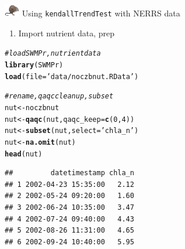 \documentclass[xcolor=dvipsnames,serif]{beamer}\usepackage[]{graphicx}\usepackage[]{color}
\makeatletter
\newcommand{\hlnum}[1]{\textcolor[rgb]{0.686,0.059,0.569}{#1}}%
\newcommand{\hlstr}[1]{\textcolor[rgb]{0.192,0.494,0.8}{#1}}%
\newcommand{\hlcom}[1]{\textcolor[rgb]{0.678,0.584,0.686}{\textit{#1}}}%
\newcommand{\hlstd}[1]{\textcolor[rgb]{0.345,0.345,0.345}{#1}}%
\newcommand{\hlkwb}[1]{\textcolor[rgb]{0.69,0.353,0.396}{#1}}%
\newcommand{\hlkwc}[1]{\textcolor[rgb]{0.333,0.667,0.333}{#1}}%
\newcommand{\hlkwd}[1]{\textcolor[rgb]{0.737,0.353,0.396}{\textbf{#1}}}%
\newenvironment{kframe}{%
 \def\at@end@of@kframe{}%
 \ifinner\ifhmode%
  \def\at@end@of@kframe{\end{minipage}}%
  \begin{minipage}{\columnwidth}%
 \fi\fi%
 \def\FrameCommand##1{\hskip\@totalleftmargin \hskip-\fboxsep
 \colorbox{shadecolor}{##1}\hskip-\fboxsep
     \hskip-\linewidth \hskip-\@totalleftmargin \hskip\columnwidth}%
 \MakeFramed {\advance\hsize-\width
   \@totalleftmargin\z@ \linewidth\hsize
   \@setminipage}}%
 {\par\unskip\endMakeFramed%
 \at@end@of@kframe}
\newenvironment{knitrout}{}{} %
\makeatother
\begin{document}
\begin{frame}[fragile]{\includegraphics[width = 0.05\textwidth]{imgs/swmprat.png} Using \texttt{kendallTrendTest} with NERRS data}
\begin{enumerate}
\item<1-> Import nutrient data, prep
\end{enumerate}
\begin{knitrout}\scriptsize
{}\color{fgcolor}\begin{kframe}
\begin{alltt}
\hlcom{# load SWMPr, nutrient data}
\hlkwd{library}\hlstd{(SWMPr)}
\hlkwd{load}\hlstd{(}\hlkwc{file} \hlstd{=} \hlstr{'data/noczbnut.RData'}\hlstd{)}

\hlcom{# rename, qaqc clean up, subset}
\hlstd{nut} \hlkwb{<-} \hlstd{noczbnut}
\hlstd{nut} \hlkwb{<-} \hlkwd{qaqc}\hlstd{(nut,} \hlkwc{qaqc_keep} \hlstd{=} \hlkwd{c}\hlstd{(}\hlnum{0}\hlstd{,} \hlnum{4}\hlstd{))}
\hlstd{nut} \hlkwb{<-} \hlkwd{subset}\hlstd{(nut,} \hlkwc{select} \hlstd{=} \hlstr{'chla_n'}\hlstd{)}
\hlstd{nut} \hlkwb{<-} \hlkwd{na.omit}\hlstd{(nut)}
\hlkwd{head}\hlstd{(nut)}
\end{alltt}
\begin{verbatim}
##         datetimestamp chla_n
## 1 2002-04-23 15:35:00   2.12
## 2 2002-05-24 09:20:00   1.60
## 3 2002-06-24 10:35:00   3.47
## 4 2002-07-24 09:40:00   4.43
## 5 2002-08-26 11:31:00   4.65
## 6 2002-09-24 10:40:00   5.95
\end{verbatim}
\end{kframe}
\end{knitrout}
\end{frame}
\end{document}
